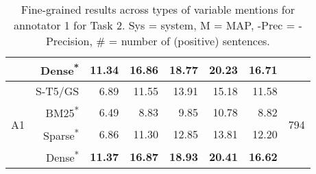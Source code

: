 \documentclass[11pt]{article}
\begin{document}
\begin{table*}[]
\begin{tabular}{l|r|r|r|r|r|r|c}
      &    Dense\textsuperscript{*} &  \textbf{11.34} &  \textbf{16.86} &   \textbf{18.77} &   \textbf{20.23} &        \textbf{16.71} &         \\
    \hline
    \hline
       \multirow{4}{2em}{A1} &    S-T5/GS &   6.89 &  11.55 &   13.91 &   15.18 &        11.58 &      \multirow{4}{2em}{794} \\
        &    BM25\textsuperscript{*} &   6.49 &   8.83 &    9.85 &   10.78 &         8.82 &       \\
        &    Sparse\textsuperscript{*} &   6.86 &  11.30 &   12.85 &   13.81 &        12.20 &       \\
        &    Dense\textsuperscript{*} &  \textbf{11.37} &  \textbf{16.87} &   \textbf{18.93} &   \textbf{20.41} &        \textbf{16.62} &       \\
    \hline
    \end{tabular}
    \caption{Fine-grained results across types of variable mentions for annotator 1 for Task 2. Sys = system, M = MAP, -Prec = -Precision, \# = number of (positive) sentences.}
    \label{tab:T2-Ann1}
\end{table*}
\end{document}

